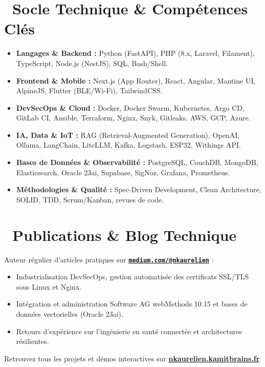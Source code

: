 \documentclass[10pt,a4paper]{article}
\begin{document}
\vspace{0.2em}

\section{\faCogs\ Socle Technique \& Compétences Clés}

\begin{itemize}[leftmargin=1.4em, itemsep=0.25em]
    \item \textbf{Langages \& Backend :} Python (FastAPI), PHP (8.x, Laravel, Filament), TypeScript, Node.js (NestJS), SQL, Bash/Shell.
    \item \textbf{Frontend \& Mobile :} Next.js (App Router), React, Angular, Mantine UI, AlpineJS, Flutter (BLE/Wi-Fi), TailwindCSS.
    \item \textbf{DevSecOps \& Cloud :} Docker, Docker Swarm, Kubernetes, Argo CD, GitLab CI, Ansible, Terraform, Nginx, Snyk, Gitleaks, AWS, GCP, Azure.
    \item \textbf{IA, Data \& IoT :} RAG (Retrieval-Augmented Generation), OpenAI, Ollama, LangChain, LiteLLM, Kafka, Logstash, ESP32, Withings API.
    \item \textbf{Bases de Données \& Observabilité :} PostgreSQL, CouchDB, MongoDB, Elasticsearch, Oracle 23ai, Supabase, SigNoz, Grafana, Prometheus.
    \item \textbf{Méthodologies \& Qualité :} Spec-Driven Development, Clean Architecture, SOLID, TDD, Scrum/Kanban, revues de code.
\end{itemize}

\vspace{0.2em}

\section{\faBookOpen\ Publications \& Blog Technique}

Auteur régulier d'articles pratiques sur \href{https://medium.com/@nkaurelien}{\textbf{\texttt{medium.com/@nkaurelien}}} :
\begin{itemize}[leftmargin=1.4em, itemsep=0.15em]
    \item Industrialisation DevSecOps, gestion automatisée des certificats SSL/TLS sous Linux et Nginx.
    \item Intégration et administration Software AG webMethods 10.15 et bases de données vectorielles (Oracle 23ai).
    \item Retours d'expérience sur l'ingénierie en santé connectée et architectures résilientes.
\end{itemize}

\vspace{1.2em}
\begin{center}
    \footnotesize\color{slateGray}
    Retrouvez tous les projets et démos interactives sur \href{https://nkaurelien.kamitbrains.fr}{\textbf{nkaurelien.kamitbrains.fr}}
\end{center}
\end{document}
